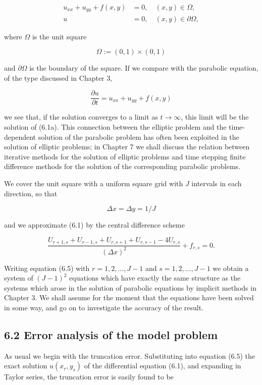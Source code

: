 \documentclass[10pt]{article}
\begin{document}
\[
\begin{aligned}
u_{x x}+u_{y y}+f(x, y) & =0, \quad(x, y) \in \Omega, \\
u & =0, \quad(x, y) \in \partial \Omega,
\end{aligned}
\]

where \(\Omega\) is the unit square

\[
\Omega:=(0,1) \times(0,1)
\]

and \(\partial \Omega\) is the boundary of the square. If we compare with the parabolic equation, of the type discussed in Chapter 3,

\[
\frac{\partial u}{\partial t}=u_{x x}+u_{y y}+f(x, y)
\]

we see that, if the solution converges to a limit as \(t \rightarrow \infty\), this limit will be the solution of (6.1a). This connection between the elliptic problem and the time-dependent solution of the parabolic problem has often been exploited in the solution of elliptic problems; in Chapter 7 we shall discuss the relation between iterative methods for the solution of elliptic problems and time stepping finite difference methods for the solution of the corresponding parabolic problems.

We cover the unit square with a uniform square grid with \(J\) intervals in each direction, so that

\[
\Delta x=\Delta y=1 / J
\]

and we approximate (6.1) by the central difference scheme

\[
\frac{U_{r+1, s}+U_{r-1, s}+U_{r, s+1}+U_{r, s-1}-4 U_{r, s}}{(\Delta x)^{2}}+f_{r, s}=0 .
\]

Writing equation (6.5) with \(r=1,2, \ldots, J-1\) and \(s=1,2, \ldots, J-1\) we obtain a system of \((J-1)^{2}\) equations which have exactly the same structure as the systems which arose in the solution of parabolic equations by implicit methods in Chapter 3. We shall assume for the moment that the equations have been solved in some way, and go on to investigate the accuracy of the result.

\subsection*{6.2 Error analysis of the model problem}
As usual we begin with the truncation error. Substituting into equation (6.5) the exact solution \(u\left(x_{r}, y_{s}\right)\) of the differential equation (6.1), and expanding in Taylor series, the truncation error is easily found to be
\end{document}
